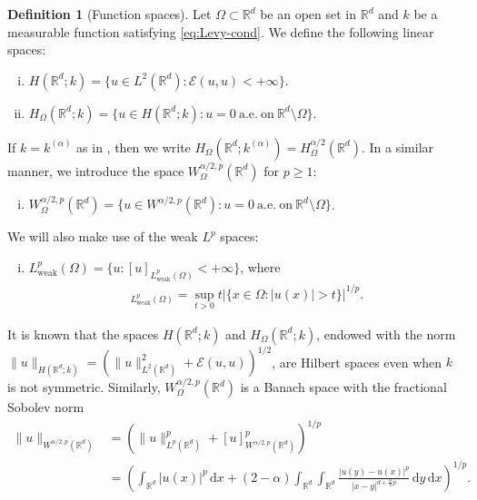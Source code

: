 \documentclass[reqno]{amsart}
\theoremstyle{plain}
\theoremstyle{definition}
\newtheorem{definition}[theorem]{Definition}
\numberwithin{equation}{section}
\newcommand{\Rd}{\mathbb{R}^d}
\newcommand{\dx} {\, \mathrm{d}x}
\newcommand{\dy} {\, \mathrm{d}y}
\begin{document}
\begin{definition} [Function spaces]
Let $\Omega \subset \Rd$ be an open set in $\Rd$ and $k$ be a measurable function satisfying \eqref{eq:Levy-cond}. We define the following linear spaces:
\begin{enumerate} [(i)]
\item
$H(\Rd; k) = \lbrace u \in L^2(\Rd) : \mathcal{E}(u, u) < +\infty \rbrace$.
\item
$H_\Omega(\Rd; k) 
= \lbrace u \in H(\Rd; k): u = 0 ~\mathrm{a.e.} ~\text{on}~ \Rd \setminus \Omega \rbrace$.
\end{enumerate}
If $k=k^{(\alpha)}$ as in , then we write $H_\Omega(\Rd; k^{(\alpha)}) = H^{\alpha/2}_{\Omega}(\Rd)$. In a similar manner, we introduce the space $W^{\alpha/2, p}_\Omega(\Rd)$ for $p \geq 1$:
\begin{enumerate} [(i)]
\item[(iii)]
$W^{\alpha/2, p}_\Omega(\Rd) = \lbrace u \in W^{\alpha/2, p}(\Rd): u = 0 ~\mathrm{a.e.} ~\text{on}~ \Rd \setminus \Omega \rbrace$.
\end{enumerate}
We will also make use of the weak $L^p$ spaces:
\begin{enumerate}[(i)]
\item[(iv)]
$L^p_\mathrm{weak}(\Omega) 
= \lbrace u : [u]_{L^p_\mathrm{weak}(\Omega)} < +\infty \rbrace$, where
\begin{align*}
[u]_{L^p_\mathrm{weak}(\Omega)} 
= \sup_{t > 0} t |\lbrace x \in \Omega : |u(x)| > t \rbrace|^{1/p}.
\end{align*}
\end{enumerate}
\end{definition}

It is known \cite{FKV15} that the spaces $H(\Rd; k)$ and $H_\Omega(\Rd; k)$, endowed with the norm $\|u\|_{H(\Rd; k)} = (\|u\|_{L^2(\Rd)}^2 + \mathcal{E}(u,u))^{1/2}$, are Hilbert spaces even when $k$ is not symmetric. Similarly, $W^{\alpha/2, p}_{\Omega}(\Rd)$ is a Banach space with the fractional Sobolev norm
\begin{equation*}
\begin{split}
\|u\|_{W^{\alpha/2,p}(\Rd)} 
&= (\|u\|_{L^p(\Rd)}^p + [u]_{W^{\alpha/2, p}(\Rd)}^p)^{1/p} \\
&= \left( \int_{\Rd} |u(x)|^p \dx + (2-\alpha)\int_{\Rd} \int_{\Rd} \frac{|u(y)-u(x)|^p}{|x-y|^{d+\frac{\alpha}{2}p}} \dy \dx \right)^{1/p}.
\end{split}
\end{equation*}
\end{document}
